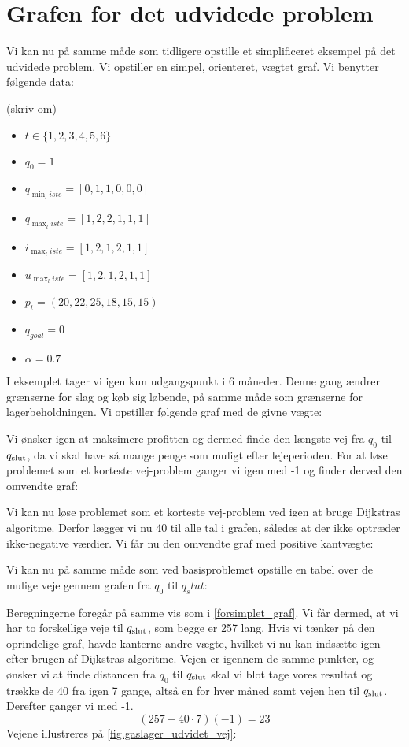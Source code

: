 \section{Grafen for det udvidede problem}
Vi kan nu på samme måde som tidligere opstille et simplificeret eksempel på det udvidede problem. Vi opstiller en simpel, orienteret, vægtet graf. Vi benytter følgende data:

(skriv om)
\begin{itemize}
  \item $t \in \{1,2,3,4,5,6\}$
  \item $q_{0}=1$
  \item $q_{\min_liste}=[0,1,1,0,0,0]$
  \item $q_{\max_liste}=[1,2,2,1,1,1]$
  \item $i_{\max_liste}=[1,2,1,2,1,1]$
  \item $u_{\max_liste}=[1,2,1,2,1,1]$
  \item $p_{t}=(20,22,25,18,15,15)$
  \item $q_{goal}=0$
  \item $\alpha=0.7$
\end{itemize}

I eksemplet tager vi igen kun udgangspunkt i 6 måneder. Denne gang ændrer grænserne for slag og køb sig løbende, på samme måde som grænserne for lagerbeholdningen. Vi opstiller følgende graf med de givne vægte:



Vi ønsker igen at maksimere profitten og dermed finde den længste vej fra $q_{0}$ til $q_{\textrm{slut}}$, da vi skal have så mange penge som muligt efter lejeperioden. For at løse problemet som et korteste vej-problem ganger vi igen med -1 og finder derved den omvendte graf:



Vi kan nu løse problemet som et korteste vej-problem ved igen at bruge Dijkstras algoritme. Derfor lægger vi nu 40 til alle tal i grafen, således at der ikke optræder ikke-negative værdier. Vi får nu den omvendte graf med positive kantvægte:




Vi kan nu på samme måde som ved basisproblemet opstille en tabel over de mulige veje gennem grafen fra $q_0$ til $q_slut$:

 


Beregningerne foregår på samme vis som i \autoref{forsimplet_graf}. Vi får dermed, at vi har to forskellige veje til $q_{\textrm{slut}}$, som begge er 257 lang. Hvis vi tænker på den oprindelige graf, havde kanterne andre vægte, hvilket vi nu kan indsætte igen efter brugen af Dijkstras algoritme. Vejen er igennem de samme punkter, og ønsker vi at finde distancen fra $q_{0}$ til $q_{\textrm{slut}}$ skal vi blot tage vores resultat og trække de 40 fra igen 7 gange, altså en for hver måned samt vejen hen til $q_{\textrm{slut}}$. Derefter ganger vi med -1.
\begin{equation}
(257-40 \cdot 7)(-1) = 23
\end{equation}
Vejene illustreres på \autoref{fig.gaslager_udvidet_vej}:



